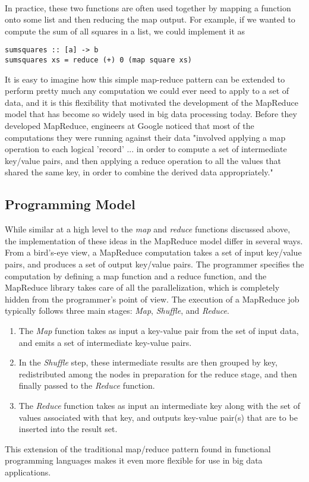 \documentclass[11pt,a4paper]{report}
\begin{document}
\paragraph*{}
In practice, these two functions are often used together by mapping a function onto some list and then reducing the map output. For example, if we wanted to compute the sum of all squares in a list, we could implement it as 
\begin{lstlisting}
sumsquares :: [a] -> b
sumsquares xs = reduce (+) 0 (map square xs)
\end{lstlisting}
It is easy to imagine how this simple map-reduce pattern can be extended to perform pretty much any computation we could ever need to apply to a set of data, and it is this flexibility that motivated the development of the MapReduce model that has become so widely used in big data processing today.  Before they developed MapReduce, engineers at Google noticed that most of the computations they were running against their data "involved applying a map operation to each logical 'record' ... in order to compute a set of intermediate key/value pairs, and then applying a reduce operation to all the values that shared the same key, in order to combine the derived data appropriately."\cite{dean2008mapreduce} 

\subsection{Programming Model}
While similar at a high level to the \textit{map} and \textit{reduce} functions discussed above, the implementation of these ideas in the MapReduce model differ in several ways. From a bird's-eye view, a MapReduce computation takes a set of input key/value pairs, and produces a set of output key/value pairs. The programmer specifies the computation by defining a map function and a reduce function, and the MapReduce library takes care of all the parallelization, which is completely hidden from the programmer's point of view. The execution of a MapReduce job typically follows three main stages: \textit{Map}, \textit{Shuffle}, and \textit{Reduce}. 
\begin{enumerate}
\item The \textit{Map} function takes as input a key-value pair from the set of input data, and emits a set of intermediate key-value pairs. 
\item In the \textit{Shuffle} step, these intermediate results are then grouped by key, redistributed among the nodes in preparation for the reduce stage, and then finally passed to the \textit{Reduce} function. 
\item The \textit{Reduce} function takes as input an intermediate key along with the set of values associated with that key, and outputs key-value pair(s) that are to be inserted into the result set.\cite{dean2008mapreduce}
\end{enumerate}
This extension of the traditional map/reduce pattern found in functional programming languages makes it even more flexible for use in big data applications.
\end{document}
